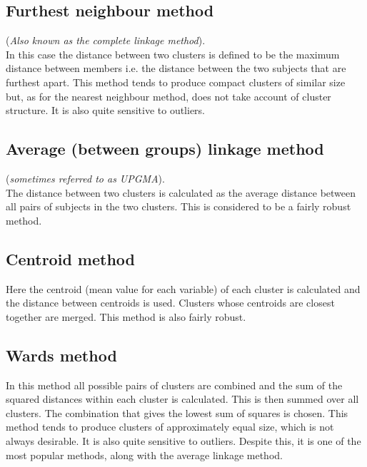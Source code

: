 \documentclass[a4paper,12pt]{article}
\begin{document}
\subsection{Furthest neighbour method}
(\textit{Also known as the complete linkage method}).\\
In this case the distance between two clusters is defined to be the maximum distance
between members  i.e. the distance between the two subjects that are furthest apart.
This method tends to produce compact clusters of similar size but, as for the nearest
neighbour method, does not take account of cluster structure. It is also quite sensitive
to outliers.

\subsection{Average (between groups) linkage method }
(\textit{sometimes referred to as UPGMA}).\\
The distance between two clusters is calculated as the average distance between all pairs
of subjects in the two clusters. This is considered to be a fairly robust method.

\subsection{Centroid method}
Here the centroid (mean value for each variable) of each cluster is calculated and the
distance between centroids is used. Clusters whose centroids are closest together are
merged. This method is also fairly robust.

\subsection{Wards method}
In this method all possible pairs of clusters are combined and the sum of the squared
distances within each cluster is calculated. This is then summed over all clusters. The
combination that gives the lowest sum of squares is chosen. This method tends to
produce clusters of approximately equal size, which is not always desirable. It is also
quite sensitive to outliers. Despite this, it is one of the most popular methods, along
with the average linkage method.
\end{document}
